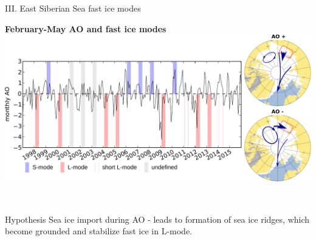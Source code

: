\documentclass[8pt]{beamer}
\begin{document}
\setwatermark{\fontsize{125pt}{125pt}\selectfont{}}
\begin{frame}[fragile]{III. East Siberian Sea fast ice modes}

	\begin{center}
	\textbf{February-May AO and fast ice modes}
	\includegraphics[width=1\textwidth]{./img/AO.pdf}\\~\\
	\end{center}
	\begin{columns}
	\begin{block}{Hypothesis}
		Sea ice import during AO - leads to formation of sea ice ridges, which become grounded and stabilize fast ice in L-mode.
	\end{block}
	\end{columns}


\end{frame}
\end{document}
